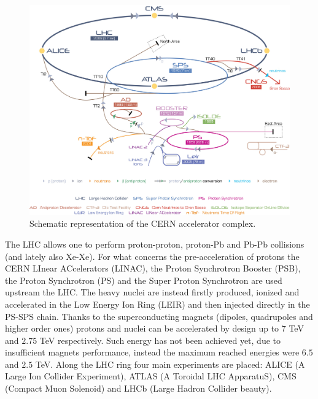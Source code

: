 \begin{figure}[!t]
\begin{center}
\includegraphics[width=\linewidth]{Chapters/Introduction/Figs/Cern-Accelerator-Complex.pdf}
\caption{Schematic representation of the CERN accelerator complex.}
\label{fig:accelerators}
\end{center}
\end{figure}

The LHC allows one to perform proton-proton, proton-Pb and Pb-Pb collisions (and lately also Xe-Xe).
For what concerns the pre-acceleration of protons the CERN LInear ACcelerators (LINAC), the Proton Synchrotron Booster (PSB), the Proton Synchrotron (PS) and the Super Proton Synchrotron are used upstream the LHC.
The heavy nuclei are instead firstly produced, ionized and accelerated in the Low Energy Ion Ring (LEIR) and then injected directly in the PS-SPS chain.
Thanks to the superconducting magnets (dipoles, quadrupoles and higher order ones) protons and nuclei can be accelerated by design up to $7$ TeV and $2.75$ TeV respectively.
Such energy has not been achieved yet, due to insufficient magnets performance, instead the maximum reached energies were $6.5$ and $2.5$ TeV.
Along the LHC ring four main experiments are placed: ALICE (A Large Ion Collider Experiment),  ATLAS (A Toroidal LHC ApparatuS), CMS (Compact Muon Solenoid) and LHCb (Large Hadron Collider beauty).

